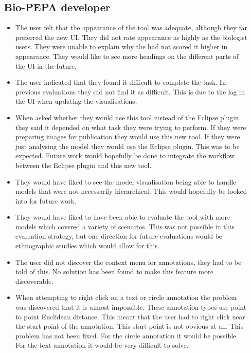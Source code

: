 \subsection{Bio-PEPA developer}

\begin{itemize}
\item The user felt that the appearance of the tool was adequate, although they far preferred the new \ac{UI}.  They did not rate appearance as highly as the biologist users.  They were unable to explain why the had not scored it higher in appearance.  They would like to see more headings on the different parts of the \ac{UI} in the future.
\item The user indicated that they found it difficult to complete the task.  In previous evaluations they did not find it as difficult.  This is due to the lag in the \ac{UI} when updating the visualisations.
\item When asked whether they would use this tool instead of the Eclipse plugin they said it depended on what task they were trying to perform.  If they were preparing images for publication they would use this new tool.  If they were just analysing the model they would use the Eclipse plugin.  This was to be expected.  Future work would hopefully be done to integrate the workflow between the Eclipse plugin and this new tool.
\item They would have liked to see the model visualisation being able to handle models that were not necessarily hierarchical.  This would hopefully be looked into for future work.
\item They would have liked to have been able to evaluate the tool with more models which covered a variety of scenarios.  This was not possible in this evaluation strategy, but one direction for future evaluations would be ethnographic studies which would allow for this.
\item The user did not discover the context menu for annotations, they had to be told of this.  No solution has been found to make this feature more discoverable.
\item When attempting to right click on a text or circle annotation the problem was discovered that it is almost impossible.  These annotation types use point to point Euclidean distance.  This meant that the user had to right click near the start point of the annotation.  This start point is not obvious at all.  This problem has not been fixed.  For the circle annotation it would be possible.  For the text annotation it would be very difficult to solve.
\end{itemize}

